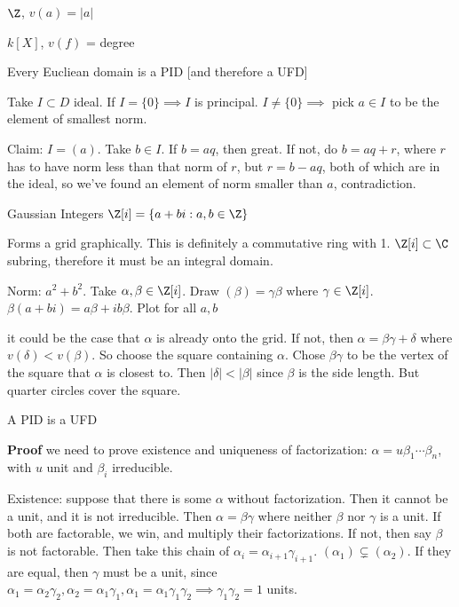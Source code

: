 \documentclass[10pt]{article}
\begin{document}
\begin{exm*}
    $\Z$, $v(a) = |a|$
\end{exm*}

\begin{exm*}
    $k[X]$, $v(f)$ = degree
\end{exm*}

\begin{thm}
    Every Eucliean domain is a PID [and therefore a UFD]
\end{thm}
Take $I \subset D$ ideal. If $I = \{0\} \implies I$ is principal. 
$I \neq \{0\} \implies$ pick $a \in I$ to be the element of smallest norm.

Claim: $I = (a)$. Take $b \in I$. If $b = aq$, then great. 
If not, do $b = aq + r$, where $r$ has to have norm less than that 
norm of $r$, but $r = b - aq$, both of which are in the ideal, 
so we've found an element of norm smaller than $a$, contradiction.

\begin{exm*}
    Gaussian Integers $\Z[i] = \{a + bi: a, b \in \Z\}$
\end{exm*}
Forms a grid graphically. This is definitely a commutative ring with 1.
$\Z[i] \subset \C$ subring, therefore it must be an integral domain.

Norm: $a^2 + b^2$. Take $\alpha, \beta \in \Z[i]$. Draw
$(\beta) = \gamma\beta$ where $\gamma \in \Z[i]$. 
$\beta(a + bi) = a\beta + i b \beta$. Plot for all $a, b$

it could be the case that $\alpha$ is already onto the grid. If not, 
then $\alpha = \beta\gamma + \delta$ where $v(\delta) < v(\beta)$. So
choose the square containing $\alpha$. Chose $\beta\gamma$ to be the
vertex of the square that $\alpha$ is closest to. Then 
$|\delta| < |\beta|$ since $\beta$ is the side length.
But quarter circles cover the square.

\begin{thm}
    A PID is a UFD
\end{thm}
\textbf{Proof} we need to prove existence and uniqueness of factorization: $\alpha = u\beta_1 \cdots \beta_n$, with $u$ unit and $\beta_i$ irreducible.

Existence: suppose that there is some $\alpha$ without factorization. Then it cannot be a unit, and it is not irreducible. Then $\alpha = \beta\gamma$ where neither $\beta$ nor $\gamma$ is a unit. If both are factorable, we win, and multiply their factorizations. If not, then say $\beta$ is not factorable. Then take this chain of $\alpha _i = \alpha_{i+1}\gamma_{i+1}$. $(\alpha_1) \subsetneq (\alpha_2)$. If they are equal, then $\gamma$ must be a unit, since $\alpha_1 = \alpha_2\gamma_2, \alpha_2 = \alpha_1 \gamma_1, \alpha_1 = \alpha_1 \gamma_1\gamma_2 \implies \gamma_1\gamma_2 = 1$ units.
\end{document}
